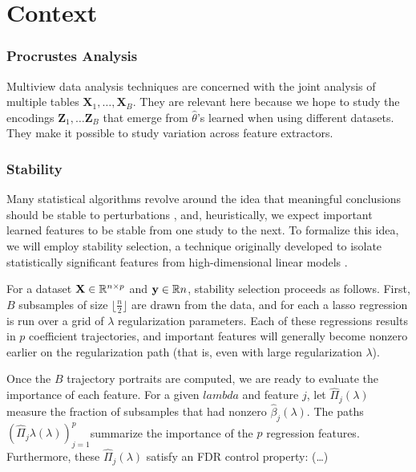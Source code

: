 
\section{Context}

\subsubsection{Procrustes Analysis}
Multiview data analysis techniques are concerned with the joint analysis of multiple tables $\mathbf{X}_{1}, \dots, \mathbf{X}_{B}$. They are relevant here because we hope to study the encodings $\mathbf{Z}_{1},\dots \mathbf{Z}_{B}$ that emerge from $\hat{\theta}$’s learned when using different datasets. They make it possible to study variation across feature extractors.

\subsubsection{Stability}

Many statistical algorithms revolve around the idea that meaningful conclusions should be stable to perturbations \cite{yu2013stability}, and, heuristically, we expect important learned features to be stable from one study to the next. To formalize this idea, we will employ stability selection, a technique originally developed to isolate statistically significant features from high-dimensional linear models  \cite{meinshausen2010stability}.

For a dataset $\mathbf{X}\in \mathbb{R}^{n \times p}$ and $\mathbf{y} \in \mathbb{R}{n}$, stability selection proceeds as follows. First, $B$ subsamples of size $\lfloor \frac{n}{2} \rfloor$ are drawn from the data, and for each a lasso regression is run over a grid of $\lambda$ regularization parameters. Each of these regressions results in $p$ coefficient trajectories, and important features will generally become nonzero earlier on the regularization path (that is, even with large regularization $\lambda$).

Once the $B$ trajectory portraits are computed, we are ready to evaluate the importance of each feature. For a given $lambda$ and feature $j$, let $\hat{\Pi}_{j}\left(\lambda\right)$ measure the fraction of subsamples that had nonzero $\hat{\beta}_j\left(\lambda\right)$.  The paths $\left(\hat{\Pi}_{j}\lambda\left(\lambda\right)\right)_{j = 1}^{p}$summarize the importance of the $p$ regression features. Furthermore, these $\hat{\Pi}_{j}\left(\lambda\right)$ satisfy an FDR control property: (…)

